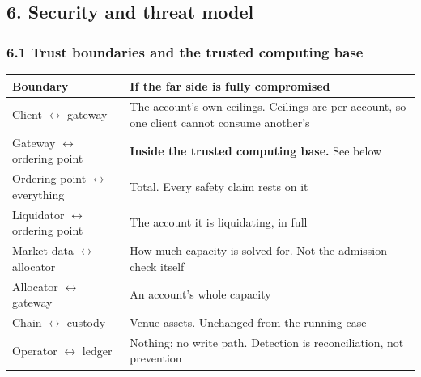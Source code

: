 \documentclass[10pt,a4paper]{article}
\newcounter{none}  %
\begin{document}
\label{start:7}%

\subsection{6. Security and threat model}\label{security-and-threat-model}

\subsubsection{6.1 Trust boundaries and the trusted computing base}\label{trust-boundaries-and-the-trusted-computing-base}

{\def\LTcaptype{none} %
\begin{longtable}[]{@{}
  >{\raggedright\arraybackslash}p{}
  >{\raggedright\arraybackslash}p{}@{}}
\toprule\noalign{}
\begin{minipage}[b]{\linewidth}\raggedright
Boundary
\end{minipage} & \begin{minipage}[b]{\linewidth}\raggedright
If the far side is fully compromised
\end{minipage} \\
\midrule\noalign{}
\endhead
\bottomrule\noalign{}
\endlastfoot
Client $\leftrightarrow$ gateway & The account's own ceilings. Ceilings are per account, so one client cannot consume another's \\
Gateway $\leftrightarrow$ ordering point & \textbf{Inside the trusted computing base.} See below \\
Ordering point $\leftrightarrow$ everything & Total. Every safety claim rests on it \\
Liquidator $\leftrightarrow$ ordering point & The account it is liquidating, in full \\
Market data $\leftrightarrow$ allocator & How much capacity is solved for. Not the admission check itself \\
Allocator $\leftrightarrow$ gateway & An account's whole capacity \\
Chain $\leftrightarrow$ custody & Venue assets. Unchanged from the running case \\
Operator $\leftrightarrow$ ledger & Nothing; no write path. Detection is reconciliation, not prevention \\
\end{longtable}
}
\end{document}
